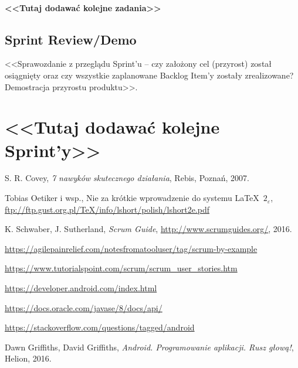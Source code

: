 \documentclass[a4paper]{article}
\begin{document}
\paragraph{<<Tutaj dodawać kolejne zadania>>}


\subsection{Sprint Review/Demo}
<<Sprawozdanie z przeglądu Sprint'u -- czy założony cel (przyrost) został osiągnięty oraz czy wszystkie zaplanowane Backlog Item'y zostały zrealizowane? Demostracja przyrostu produktu>>.

\section*{<<Tutaj dodawać kolejne Sprint'y>>}


\begin{thebibliography}{9}

 S. R. Covey, {\em 7 nawyków skutecznego działania}, Rebis, Poznań, 2007.

 Tobias Oetiker i wsp., Nie za krótkie wprowadzenie do systemu \LaTeX  \ $2_\varepsilon$, \url{ftp://ftp.gust.org.pl/TeX/info/lshort/polish/lshort2e.pdf}

 K. Schwaber, J. Sutherland, {\em Scrum Guide}, \url{http://www.scrumguides.org/}, 2016.

 \url{https://agilepainrelief.com/notesfromatooluser/tag/scrum-by-example}

 \url{https://www.tutorialspoint.com/scrum/scrum_user_stories.htm}

 \url{https://developer.android.com/index.html}

 \url{https://docs.oracle.com/javase/8/docs/api/}

 \url{https://stackoverflow.com/questions/tagged/android}

 Dawn Griffiths, David Griffiths, {\em Android. Programowanie aplikacji. Rusz głową!}, Helion, 2016.

\end{thebibliography}
\end{document}
